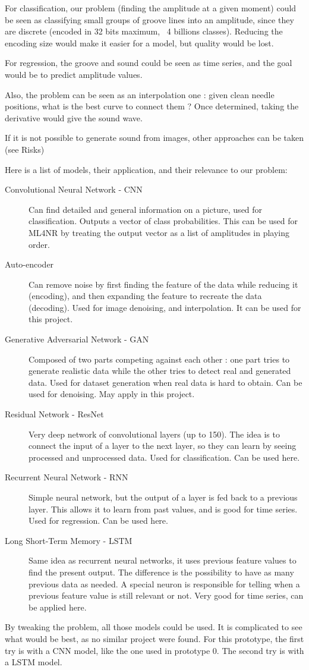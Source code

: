 \documentclass[12pt, twoside]{article}
\begin{document}
For classification, our problem (finding the amplitude at a given moment) could be seen as classifying small groups of groove lines into an amplitude, since they are discrete (encoded in 32 bits maximum, ~4 billions classes). Reducing the encoding size would make it easier for a model, but quality would be lost.

For regression, the groove and sound could be seen as time series, and the goal would be to predict amplitude values.

Also, the problem can be seen as an interpolation one : given clean needle positions, what is the best curve to connect them ? Once determined, taking the derivative would give the sound wave.

If it is not possible to generate sound from images, other approaches can be taken (see Risks)

Here is a list of models, their application, and their relevance to our problem:
\begin{description}
	\item[Convolutional Neural Network - CNN] Can find detailed and general information on a picture, used for classification. Outputs a vector of class probabilities. This can be used for ML4NR by treating the output vector as a list of amplitudes in playing order.
	\item[Auto-encoder] Can remove noise by first finding the feature of the data while reducing it (encoding), and then expanding the feature to recreate the data (decoding). Used for image denoising, and interpolation. It can be used for this project.
	\item[Generative Adversarial Network - GAN] Composed of two parts competing against each other : one part tries to generate realistic data while the other tries to detect real and generated data. Used for dataset generation when real data is hard to obtain. Can be used for denoising. May apply in this project.
	\item[Residual Network - ResNet] Very deep network of convolutional layers (up to 150). The idea is to connect the input of a layer to the next layer, so they can learn by seeing processed and unprocessed data. Used for classification. Can be used here.
	\item[Recurrent Neural Network - RNN] Simple neural network, but the output of a layer is fed back to a previous layer. This allows it to learn from past values, and is good for time series. Used for regression. Can be used here.
	\item[Long Short-Term Memory - LSTM] Same idea as recurrent neural networks, it uses previous feature values to find the present output. The difference is the possibility to have as many previous data as needed. A special neuron is responsible for telling when a previous feature value is still relevant or not. Very good for time series, can be applied here.   
\end{description}
By tweaking the problem, all those models could be used. It is complicated to see what would be best, as no similar project were found. For this prototype, the first try is with a CNN model, like the one used in prototype 0. The second try is with a LSTM model.
\end{document}
